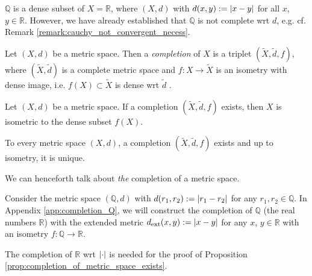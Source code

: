 \begin{exmp}
	$\mathbb Q$ is a dense subset of $X = \mathbb R$, where $\left(X, d\right)$ with $d(x, y) := \left\vert x-y \right\vert$ for all $x$, $y\in\mathbb R$. However, we have already established that $\mathbb Q$ is not complete wrt $d$, e.g. cf. Remark \ref{remark:cauchy_not_convergent_necess}.
\end{exmp}

\begin{defn}
	Let $(X, d)$ be a metric space. Then a \textit{completion} of $X$ is a triplet $\left(\tilde{X}, \tilde{d}, f\right)$, where $\left(\tilde{X}, \tilde{d}\right)$ is a complete metric space and $f: X\to\tilde{X}$ is an isometry with dense image, i.e. $f(X)\subset \tilde{X}$ is dense wrt $\tilde{d}$ \cite[Def. 2.2]{src:completion_metric_spaces}.
\end{defn}

\begin{remark}
	Let $(X, d)$ be a metric space. If a completion $\left(\tilde{X}, \tilde{d}, f\right)$ exists, then $X$ is isometric to the dense subset $f(X)$.
\end{remark}

\begin{proposition}\label{prop:completion_of_metric_space_exists}
	To every metric space $(X, d)$, a completion $\left(\tilde{X}, \tilde{d}, f\right)$ exists and up to isometry, it is unique.
\end{proposition}

\begin{remark}
	We can henceforth talk about \textit{the} completion of a metric space.
\end{remark}

\begin{exmp}
	Consider the metric space $(\mathbb Q, d)$ with $d(r_1, r_2) := \left\vert r_1 - r_2 \right\vert$ for any $r_1, r_2\in\mathbb Q$. In Appendix \ref{app:completion_Q}, we will construct the completion of $\mathbb Q$ (the real numbers $\mathbb R$) with the extended metric $d_{\text{ext}}(x, y) := \left\vert x - y \right\vert$ for any $x$, $y\in\mathbb R$ with an isometry $f:\mathbb Q\to\mathbb R$.
\end{exmp}

\begin{remark}
	The completion of $\mathbb R$ wrt $\left\vert \cdot \right\vert$ is needed for the proof of Proposition \ref{prop:completion_of_metric_space_exists}.
\end{remark}

